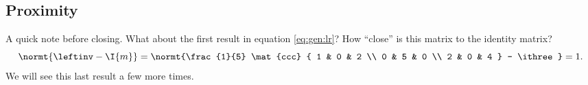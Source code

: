 \subsection{Proximity}
A quick note before closing. What about the first result in equation \eqref{eq:gen:lr}? How ``close'' is this matrix to the identity matrix?
\begin{equation}
\normt{\leftinv-\I{m}} = 
\normt{\frac{1}{5}
  \mat{ccc}
  {
 1 & 0 & 2 \\
 0 & 5 & 0 \\
 2 & 0 & 4
  }
  -
  \ithree} = 1.
\end{equation}
We will see this last result a few more times.

\endinput